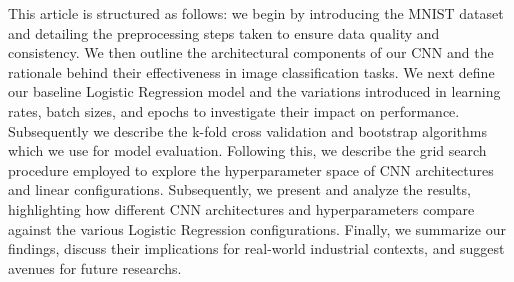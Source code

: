 This article is structured as follows: we begin by introducing the MNIST dataset and detailing the preprocessing steps taken to ensure data quality and consistency. We then outline the architectural components of our CNN and the rationale behind their effectiveness in image classification tasks. We next define our baseline Logistic Regression model and the variations introduced in learning rates, batch sizes, and epochs to investigate their impact on performance. Subsequently we describe the k-fold cross validation and bootstrap algorithms which we use for model evaluation. Following this, we describe the grid search procedure employed to explore the hyperparameter space of CNN architectures and linear configurations. Subsequently, we present and analyze the results, highlighting how different CNN architectures and hyperparameters compare against the various Logistic Regression configurations. Finally, we summarize our findings, discuss their implications for real-world industrial contexts, and suggest avenues for future researchs.